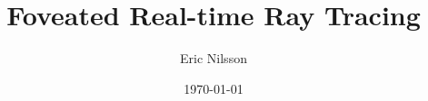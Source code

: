 \documentclass[12pt,twocolumn]{article}
\begin{document}
\title{Foveated Real-time Ray Tracing}
\author{Eric Nilsson}
\date{\today}

\maketitle







{}

\end{document}

